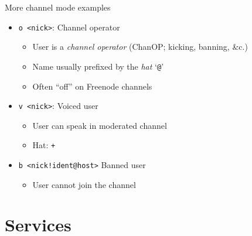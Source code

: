 \documentclass{beamer}
\begin{document}
\begin{frame}{More channel mode examples}
\begin{itemize}
	\item \texttt{o <nick>}: Channel operator
	\begin{itemize}
		\item User is a \emph{channel operator} (ChanOP; kicking, banning, \&c.)
		\item Name usually prefixed by the \emph{hat} `\texttt{@}'
		\item Often ``off'' on Freenode channels
	\end{itemize}
	\item \texttt{v <nick>}: Voiced user
	\begin{itemize}
		\item User can speak in moderated channel
		\item Hat: \texttt{+}
	\end{itemize}
	\item \texttt{b <nick!ident@host>} Banned user
	\begin{itemize}
		\item User cannot join the channel
	\end{itemize}
\end{itemize}
\end{frame}

\section{Services}
\end{document}
